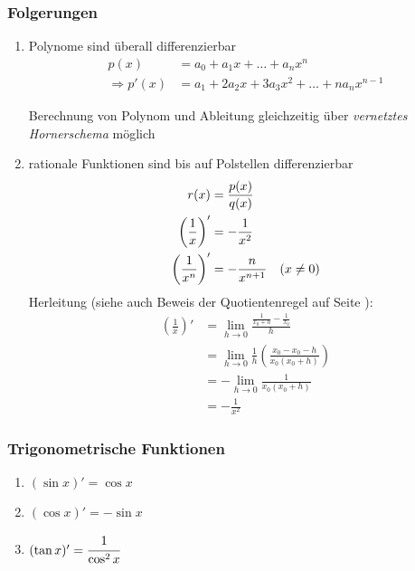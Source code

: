 
\subsubsection*{Folgerungen}

\begin{enumerate}
	\item Polynome sind überall differenzierbar \\
	\begin{align*}
		p(x) &= a_0 + a_1 x + \dots + a_n x^n \\
		\Rightarrow p'(x) &= a_1 + 2 a_2 x + 3 a_3 x^2 + \dots + n a_n x^{n-1}
	\end{align*}
	\begin{note}Berechnung von Polynom und Ableitung gleichzeitig über \emph{vernetztes Hornerschema} möglich\end{note}
	\item rationale Funktionen sind bis auf Polstellen differenzierbar
	\begin{align*}
		r(x) &= \frac{p(x)}{q(x)} \\
		\left( \frac{1}{x} \right)' &= -\frac{1}{x^2} \\
		\left( \frac{1}{x^n} \right)' &= -\frac{n}{x^{n+1}} \hspace{10px} (x \neq 0)
	\end{align*}
	Herleitung (siehe auch Beweis der Quotientenregel auf Seite \pageref{proof:quotregel}):
	\begin{align*}
		\left( \frac{1}{x} \right)' &= \lim\limits_{h \rightarrow 0} \frac{\frac{1}{x_0+h} - \frac{1}{x_0}}{h} \\
		&= \lim\limits_{h \rightarrow 0} \frac{1}{h} \left( \frac{x_0 - x_0 - h}{x_0 (x_0+h)} \right) \\
		&= - \lim\limits_{h \rightarrow 0} \frac{1}{x_0 (x_0 + h)} \\
		&= -\frac{1}{x^2}
	\end{align*}
\end{enumerate}

\subsubsection*{Trigonometrische Funktionen}
\begin{enumerate}
	\item $ (\sin x)' = \cos x $
	\item $ (\cos x)' = - \sin x $
	\item $ (\tan x)' = \cfrac{1}{\cos^2 x} $
\end{enumerate}

